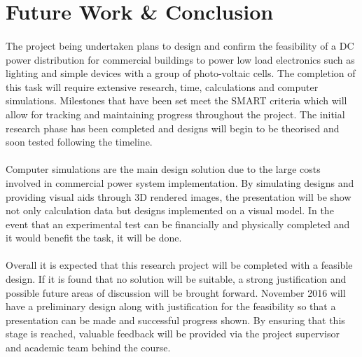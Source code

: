 \section{Future Work \& Conclusion}

\paragraph{}
The project being undertaken plans to design and confirm the feasibility of a DC power distribution for commercial buildings to power low load electronics such as lighting and simple devices with a group of photo-voltaic cells. The completion of this task will require extensive research, time, calculations and computer simulations. Milestones that have been set meet the SMART criteria which will allow for tracking and maintaining progress throughout the project. The initial research phase has been completed and designs will begin to be theorised and soon tested following the timeline. 

\paragraph{}
Computer simulations are the main design solution due to the large costs involved in commercial power system implementation. By simulating designs and providing visual aids through 3D rendered images, the presentation will be show not only calculation data but designs implemented on a visual model. In the event that an experimental test can be financially and physically completed and it would benefit the task, it will be done.    

\paragraph{}
Overall it is expected that this research project will be completed with a feasible design. If it is found that no solution will be suitable, a strong justification and possible future areas of discussion will be brought forward. November 2016 will have a preliminary design along with justification for the feasibility so that a presentation can be made and successful progress shown. By ensuring that this stage is reached, valuable feedback will be provided via the project supervisor and academic team behind the course. 
\newpage